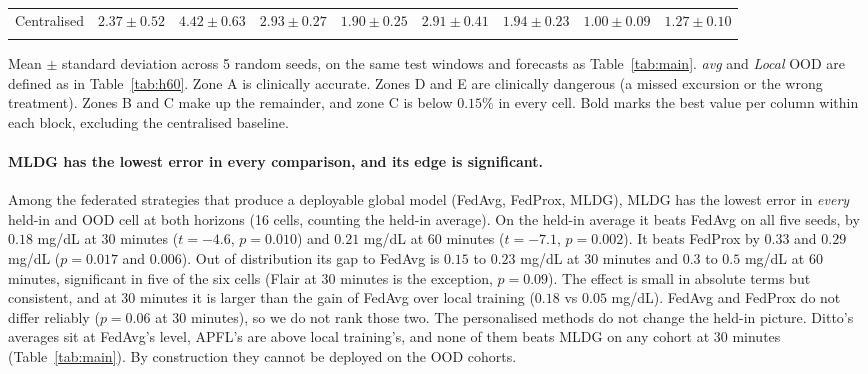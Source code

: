 \documentclass[10pt,letterpaper]{article}
\newlength\savedwidth
\newcommand\thickhline{\noalign{\global\savedwidth\arrayrulewidth\global\arrayrulewidth 2pt}%
\hline
\noalign{\global\arrayrulewidth\savedwidth}}
\begin{document}
\begin{table}[!ht]
{\begin{tabular}{lcccccccc}
Centralised & $2.37 \pm 0.52$ & $4.42 \pm 0.63$ & $2.93 \pm 0.27$ & $1.90 \pm 0.25$ & $2.91 \pm 0.41$ & $1.94 \pm 0.23$ & $1.00 \pm 0.09$ & $1.27 \pm 0.10$ \\
\thickhline
\end{tabular}}
\begin{center}
{\small Mean $\pm$ standard deviation across 5 random seeds, on the same
test windows and forecasts as Table~\ref{tab:main}. \emph{avg} and
\emph{Local} OOD are defined as in Table~\ref{tab:h60}. Zone A is
clinically accurate. Zones D and E are clinically dangerous (a missed
excursion or the wrong treatment). Zones B and C make up the remainder, and
zone C is below $0.15\%$ in every cell. Bold marks the best value per column
within each block, excluding the centralised baseline.}
\end{center}
\end{table}

\paragraph{MLDG has the lowest error in every comparison, and its edge is
significant.} Among the federated strategies that produce a deployable global
model (FedAvg, FedProx, MLDG), MLDG has the lowest error in \emph{every}
held-in and OOD cell at both horizons (16 cells, counting the held-in
average). On the held-in average it
beats FedAvg on all five seeds, by $0.18$ mg/dL at 30 minutes ($t = -4.6$,
$p = 0.010$) and $0.21$ mg/dL at 60 minutes ($t = -7.1$, $p = 0.002$). It
beats FedProx by $0.33$ and $0.29$ mg/dL ($p = 0.017$ and $0.006$). Out of
distribution its gap to FedAvg is $0.15$ to $0.23$ mg/dL at 30 minutes and
$0.3$ to $0.5$ mg/dL at 60 minutes, significant in five of the six cells
(Flair at 30 minutes is the exception, $p = 0.09$). The effect is small in
absolute terms but consistent, and at 30 minutes it is larger than the gain
of FedAvg over local training ($0.18$ vs $0.05$ mg/dL). FedAvg and FedProx
do not differ reliably ($p = 0.06$ at 30 minutes), so we do not rank those
two. The personalised methods do not change the held-in picture. Ditto's
averages sit at FedAvg's level, APFL's are above local training's, and
none of them beats MLDG on any cohort at 30 minutes (Table~\ref{tab:main}).
By construction they cannot be deployed on the OOD cohorts.
\end{document}
